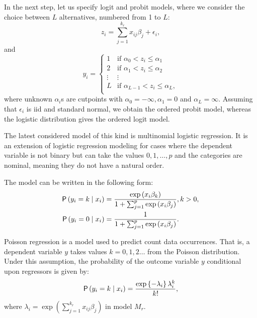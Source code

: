 In the next step, let us specify logit and probit models, where
we consider the choice between $L$ alternatives, numbered from 1 to $L$:
\begin{equation}
		z_i= \sum_{j=1}^{k_r}x_{ij}\beta_{j} + \epsilon_i,
\end{equation}
and
\begin{equation*}
		y_i= \left \{ 
			\begin{array}{lc}
					 1 & \text{if } \alpha_0 < z_i \leq  \alpha_1 \\
					 2 & \text{if } \alpha_1 < z_i \leq  \alpha_2 \\
					 \vdots & \vdots \\
					L & \text{if } \alpha_{L-1} < z_i \leq  \alpha_{L}, \\
			\end{array}\right.
\end{equation*}
where unknown $\alpha_i$s are cutpoints with
$\alpha_0 = -\infty, \alpha_1 = 0$ and $\alpha_L = \infty$.
Assuming that $\epsilon_i$ is iid and standard normal, we obtain
the ordered probit model, whereas the logistic distribution
gives the ordered logit model.

The latest considered model of this kind is multinomial logistic
regression. It is an extension of logistic regression modeling
for cases where the dependent variable is not binary but can
take the values $0,1, \ldots, p$ and the categories are nominal,
meaning they do not have a natural order.

The model can be written in the following form:
\begin{align}
	\mathsf{P}\left(y_i= k\mid x_i\right) &= \frac{\exp \left( x_i\beta_k\right)} {1+\sum_{j=1}^{p}\exp{(x_i\beta_j)}}, k > 0,\\
	\mathsf{P}\left(y_i= 0\mid x_i\right) &= \frac{1} {1+\sum_{j=1}^{p}\exp{(x_i\beta_j)}}.
\end{align}

Poisson regression is a model used to predict count data
occurrences. That is, a dependent variable $y$ takes values
$k=0,1, 2\ldots$ from the Poisson distribution. Under this
assumption, the probability of the outcome variable $y$
conditional upon regressors is given by:
\begin{equation}
	\mathsf{P}\left(y_i= k\mid x_i\right)  = \frac{\exp \left\{-\lambda_{i} \right\} \lambda_{i}^k}{k!},
\end{equation}
where $\lambda_i= \exp(\sum_{j=1}^{k_r}x_{ij}\beta_{j})$ in model $M_r$.

